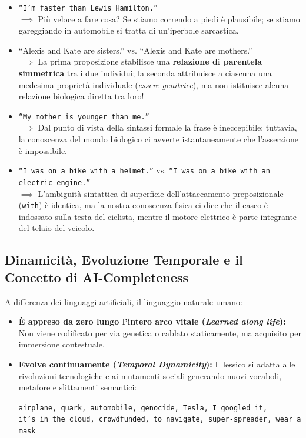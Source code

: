 \begin{itemize}
    \item \texttt{``I'm faster than Lewis Hamilton.''} \\
    $\implies$ Pi\`u veloce a fare cosa? Se stiamo correndo a piedi \`e plausibile; se stiamo gareggiando in automobile si tratta di un'iperbole sarcastica.
    \item ``Alexis and Kate are sisters.'' vs. ``Alexis and Kate are mothers.'' \\
    $\implies$ La prima proposizione stabilisce una \textbf{relazione di parentela simmetrica} tra i due individui; la seconda attribuisce a ciascuna una medesima propriet\`a individuale (\textit{essere genitrice}), ma non istituisce alcuna relazione biologica diretta tra loro!
    \item \texttt{``My mother is younger than me.''} \\
    $\implies$ Dal punto di vista della sintassi formale la frase \`e ineccepibile; tuttavia, la conoscenza del mondo biologico ci avverte istantaneamente che l'asserzione \`e impossibile.
    \item \texttt{``I was on a bike with a helmet.''} vs. \texttt{``I was on a bike with an electric engine.''} \\
    $\implies$ L'ambiguit\`a sintattica di superficie dell'attaccamento preposizionale (\texttt{with}) \`e identica, ma la nostra conoscenza fisica ci dice che il casco \`e indossato sulla testa del ciclista, mentre il motore elettrico \`e parte integrante del telaio del veicolo.
\end{itemize}

\FloatBarrier
\subsection{Dinamicit\`a, Evoluzione Temporale e il Concetto di AI-Completeness}
\label{subsec:dinamicita-ai-completeness}

A differenza dei linguaggi artificiali, il linguaggio naturale umano:
\begin{itemize}
    \item \textbf{\`E appreso da zero lungo l'intero arco vitale (\textit{Learned along life}):} Non viene codificato per via genetica o cablato staticamente, ma acquisito per immersione contestuale.
    \item \textbf{Evolve continuamente (\textit{Temporal Dynamicity}):} Il lessico si adatta alle rivoluzioni tecnologiche e ai mutamenti sociali generando nuovi vocaboli, metafore e slittamenti semantici:
    \begin{center}
    \texttt{airplane, quark, automobile, genocide, Tesla, I googled it,} \\
    \texttt{it's in the cloud, crowdfunded, to navigate, super-spreader, wear a mask}
    \end{center}
\end{itemize}

